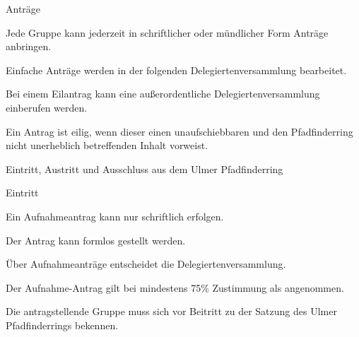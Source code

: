 \begin{legal}
\begin{legal}
            \item Anträge
                \begin{legal}
                    \item Jede Gruppe kann jederzeit in schriftlicher oder mündlicher Form Anträge 
                          anbringen.
                    \item Einfache Anträge werden in der folgenden Delegiertenversammlung 
                          bearbeitet.
                \end{legal}
            \item Bei einem Eilantrag kann eine außerordentliche Delegiertenversammlung 
                  einberufen werden.
                  \begin{legal}
                      \item Ein Antrag ist eilig, wenn dieser einen unaufschiebbaren und den 
                            Pfadfinderring nicht unerheblich betreffenden Inhalt vorweist.
                  \end{legal}
        \end{legal}
    \item Eintritt, Austritt und Ausschluss aus dem Ulmer Pfadfinderring
        \begin{legal}
            \item Eintritt
                \begin{legal}
                    \item Ein Aufnahmeantrag kann nur schriftlich erfolgen.
                        \begin{legal}
                            \item Der Antrag kann formlos gestellt werden.
                        \end{legal}
                    \item Über Aufnahmeanträge entscheidet die Delegiertenversammlung.
                        \begin{legal}
                            \item Der Aufnahme-Antrag gilt bei mindestens 75\% Zustimmung als 
                                  angenommen.
                        \end{legal}
                    \item Die antragstellende Gruppe muss sich vor Beitritt zu der Satzung des 
                          Ulmer Pfadfinderrings bekennen.
                \end{legal}

\end{legal}
\end{legal}
